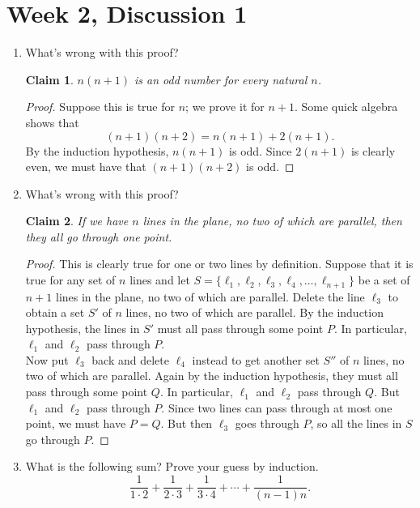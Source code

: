 \documentclass[11pt,letterpaper]{report}
\newtheorem*{claim*}{Claim}
\theoremstyle{definition}
\theoremstyle{remark}
\begin{document}
\section{Week 2, Discussion 1}
\begin{enumerate}

	\item What's wrong with this proof?
	\begin{claim*}
		$n(n+1)$ is an odd number for every natural $n$.
	\end{claim*}
	\begin{proof}
		Suppose this is true for $n$; we prove it for $n+1$. Some quick algebra shows that
		\[
		(n+1)(n+2) = n(n+1) + 2(n+1).
		\]
		By the induction hypothesis, $n(n+1)$ is odd. Since $2(n+1)$ is clearly even, we must have that $(n+1)(n+2)$ is odd.
	\end{proof}
	\vfill

	\item What's wrong with this proof?
	\begin{claim*}
		If we have $n$ lines in the plane, no two of which are parallel, then they all go through one point.
	\end{claim*}
	\begin{proof}
		This is clearly true for one or two lines by definition. Suppose that it is true for any set of $n$ lines and let $S = \{\ell_1, \ell_2, \ell_3, \ell_4,  \ldots, \ell_{n+1}\}$ be a set of $n+1$ lines in the plane, no two of which are parallel. Delete the line $\ell_3$ to obtain a set $S'$ of $n$ lines, no two of which are parallel. By the induction hypothesis, the lines in $S'$ must all pass through some point $P$. In particular, $\ell_1$ and $\ell_2$ pass through $P$.\\

		\noindent Now put $\ell_3$ back and delete $\ell_4$ instead to get another set $S''$ of $n$ lines, no two of which are parallel. Again by the induction hypothesis, they must all pass through some point $Q$. In particular, $\ell_1$ and $\ell_2$ pass through $Q$. But $\ell_1$ and $\ell_2$ pass through $P$. Since two lines can pass through at most one point, we must have $P = Q$. But then $\ell_3$ goes through $P$, so all the lines in $S$ go through $P$.
	\end{proof}

	\vfill

	\item What is the following sum? Prove your guess by induction.
	\[
	\frac{1}{1\cdot 2} + \frac{1}{2\cdot 3} + \frac{1}{3\cdot 4} + \cdots + \frac{1}{(n-1)n}.
	\]


\end{enumerate}
\end{document}
